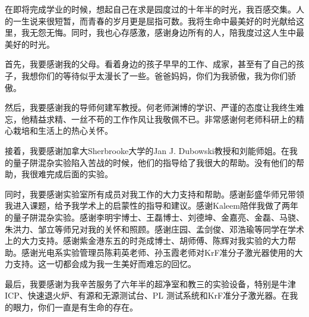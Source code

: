 \documentclass[oneside]{ZJUthesis}
\begin{document}
\begin{thanks}
在即将完成学业的时候，想起自己在求是园度过的十年半的时光，我百感交集。人的一生说来很短暂，而青春的岁月更是屈指可数。我将生命中最美好的时光献给这里，我无怨无悔。同时，我也心存感激，感谢身边所有的人，陪我度过这人生中最美好的时光。

首先，我要感谢我的父母。看着身边的孩子早早的工作、成家，甚至有了自己的孩子，我想你们的等待似乎太漫长了一些。爸爸妈妈，你们为我骄傲，我为你们骄傲。

然后，我要感谢我的导师何建军教授。何老师渊博的学识、严谨的态度让我终生难忘，他精益求精、一丝不苟的工作作风让我敬佩不已。非常感谢何老师科研上的精心栽培和生活上的热心关怀。

接着，我要感谢加拿大Sherbrooke大学的Jan J. Dubowski教授和刘能师姐。在我的量子阱混杂实验陷入苦战的时候，他们的指导给了我很大的帮助。没有他们的帮助，我很难完成后面的实验。

同时，我要感谢实验室所有成员对我工作的大力支持和帮助。感谢彭盛华师兄带领我进入课题，给予我学术上的启蒙性的指导和建议。感谢Kaleem陪伴我做了两年的量子阱混杂实验。感谢李明宇博士、王磊博士、刘德坤、金嘉亮、金磊、马骁、朱洪力、邹立等师兄对我的关怀和照顾。感谢庄园、孟剑俊、邓浩瑜等同学在学术上的大力支持。感谢紫金港东五的时尧成博士、胡师傅、陈辉对我实验的大力帮助。感谢光电系实验管理员陈莉英老师、孙玉霞老师对KrF准分子激光器使用的大力支持。这一切都会成为我一生美好而难忘的回忆。

最后，我要感谢为我辛苦服务了六年半的超净室和教三的实验设备，特别是牛津ICP、快速退火炉、有源和无源测试台、PL 测试系统和KrF准分子激光器。在我的眼力，你们一直是有生命的存在。
\end{thanks}
\end{document}
